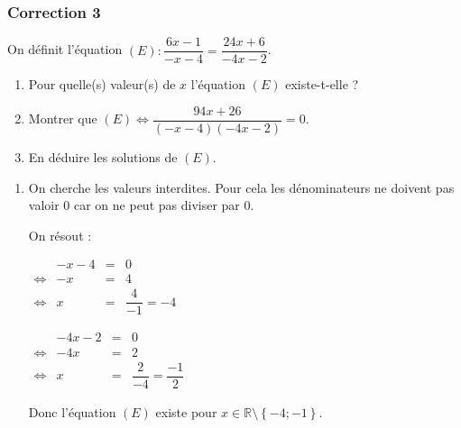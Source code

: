 \documentclass[15pt, mathserif]{beamer}
\newcommand{\R}{\mathbb{R}}			%
\begin{document}
\begin{frame}
\vspace{-10mm}
	\frametitle{Correction 3}
 \vspace*{1cm} 
 
 On définit l'équation $(E):\dfrac{6x-1}{-x-4}=\dfrac{24x+6}{-4x-2}$. 
 \begin{enumerate} 
 	 \item Pour quelle(s) valeur(s) de $x$ l'équation $(E)$ existe-t-elle ? 
 	 \item Montrer que $(E) \Leftrightarrow \dfrac{94x+26}{(-x-4)(-4x-2)}=0$. 
 	 \item En déduire les solutions de $(E)$. 
 \end{enumerate} 
 
 \begin{enumerate} 
 	 \item On cherche les valeurs interdites. Pour cela les dénominateurs ne doivent pas valoir 0 car on ne peut pas diviser par 0. 
 
 	 On résout : 
 
  \begin{minipage}{0.45\linewidth} 
 	 $\begin{array}{crcl} 
 	 	 & -x-4& = & 0 \\ 
 	 	 	 \Leftrightarrow &-x & = &4\\ 
 	 	 	 \Leftrightarrow & x & = & \dfrac{4}{-1}=-4
 	 	 \end{array} $ 
 	 \end{minipage} \hfil \begin{minipage}{0.45\linewidth} 
 	 $\begin{array}{crcl} 
 	 	 & -4x-2& = & 0 \\ 
 	 	 	 \Leftrightarrow &-4x & = &2 \\ 
 	 	 	 \Leftrightarrow & x & = & \dfrac{2}{-4}=\dfrac{-1}{2}
 	 	 \end{array} $ 
 
 	 \end{minipage} 
 
 Donc l'équation $(E)$ existe pour $x \in \R \setminus \left\{-4;-1\right\}$. 
 \end{enumerate} 
 \end{frame} 
\end{document}

